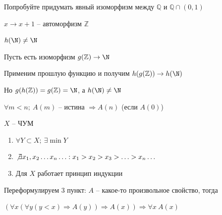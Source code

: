 \documentclass[12pt]{article}
\begin{document}
\begin{Exercise}{}
    Попробуйте придумать явный изоморфизм между $\mathbb{Q}$ и $\mathbb{Q} \cap (0, 1)$
\end{Exercise}

\begin{Remark}{}
    $x \to x + 1$ -- автоморфизм $\mathbb{Z}$

    $h(\N) \neq \N$

    Пусть есть изоморфизм $g(\mathbb{Z}) \to \N$

    Применим прошлую функцию и получим $h(g(\mathbb{Z})) \to h(\N)$

    Но $g(h(\mathbb{Z})) = g(\mathbb{Z}) = \N$, а $h(\N) \neq \N$
\end{Remark}

\begin{nota}{}
    $\forall m < n;\ A(m)$ -- истина $\Rightarrow A(n)$ (если $A(0)$)
\end{nota}

\begin{theo}{}
    $X$ -- ЧУМ

    \begin{enumerate}
        \item $\forall Y \subset X;\ \exists \min Y$
        \item $\not\exists x_1, x_2 \ldots x_n \ldots : x_1 > x_2 > x_3 > \ldots > x_n \ldots$
        \item Для $X$ работает принцип индукции
    \end{enumerate}
\end{theo}

\begin{Remark}{}
    Переформулируем 3 пункт: $A$ -- какое-то произвольное свойство, тогда

    $(\forall x(\forall y(y < x) \Rightarrow A(y)) \Rightarrow A(x)) \Rightarrow \forall x\ A(x)$
\end{Remark}
\end{document}
